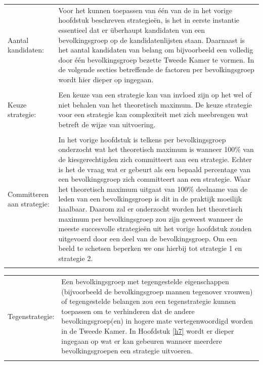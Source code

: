 \noindent\begin{tabularx}{\textwidth}{LI}
Aantal kandidaten: &  Voor het kunnen toepassen van één van de in het vorige hoofdstuk beschreven strategie\"{e}n, is het in eerste instantie essentieel dat er \"{u}berhaupt kandidaten van een bevolkingsgroep op de kandidatenlijsten staan. Daarnaast is het aantal kandidaten van belang om bijvoorbeeld een volledig door één bevolkingsgroep bezette Tweede Kamer te vormen. In de volgende secties betreffende de factoren per bevolkingsgroep wordt hier dieper op ingegaan. \\
\\ 
Keuze strategie: &  Een keuze van een strategie kan van invloed zijn op het wel of niet behalen van het theoretisch maximum. De keuze strategie voor een strategie kan complexiteit met zich meebrengen wat betreft de wijze van uitvoering.\\
\\ 
Committeren aan strategie:  & In het vorige hoofdstuk is telkens per bevolkingsgroep onderzocht wat het theoretisch maximum is wanneer 100\% van de kiesgerechtigden zich committeert aan een strategie. Echter is het de vraag wat er gebeurt als een bepaald percentage van een bevolkingsgroep zich committeert aan een strategie. Waar het theoretisch maximum uitgaat van 100\% deelname van de leden van een bevolkingsgroep is dit in de praktijk moeilijk haalbaar. Daarom zal er onderzocht worden het theoretisch maximum per bevolkingsgroep zou zijn geweest wanneer de meeste succesvolle strategie\"{e}n uit het vorige hoofdstuk zouden uitgevoerd door een deel van de bevolkingsgroep. Om een beeld te schetsen beperken we ons hierbij tot strategie 1 en strategie 2.  \\
\\
\end{tabularx}  
 
\noindent\begin{tabularx}{\textwidth}{LI}

Tegenstrategie: & Een bevolkingsgroep met tegengestelde eigenschappen (bijvoorbeeld de bevolkingsgroep mannen tegenover vrouwen) of tegengestelde belangen zou een tegenstrategie  kunnen toepassen om te verhinderen dat de andere bevolkingsgroep(en) in hogere mate vertegenwoordigd worden in de Tweede Kamer. In Hoofdstuk \ref{h7} wordt er dieper ingegaan op wat er kan gebeuren wanneer meerdere bevolkingsgroepen een strategie uitvoeren.\\
\\
 \end{tabularx}  


